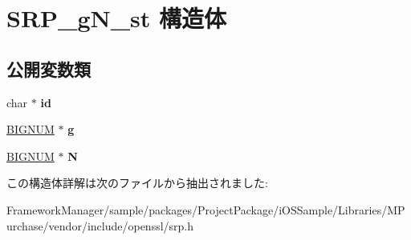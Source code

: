 \hypertarget{struct_s_r_p__g_n__st}{}\section{S\+R\+P\+\_\+g\+N\+\_\+st 構造体}
\label{struct_s_r_p__g_n__st}
\subsection*{公開変数類}
\begin{DoxyCompactItemize}
\item 
\hypertarget{struct_s_r_p__g_n__st_a26863009016da8a8a42ee5d50977327a}{}char $\ast$ {\bfseries id}\label{struct_s_r_p__g_n__st_a26863009016da8a8a42ee5d50977327a}

\item 
\hypertarget{struct_s_r_p__g_n__st_a4527dc1f493a42d33e790a86775ee7d2}{}\hyperlink{structbignum__st}{B\+I\+G\+N\+U\+M} $\ast$ {\bfseries g}\label{struct_s_r_p__g_n__st_a4527dc1f493a42d33e790a86775ee7d2}

\item 
\hypertarget{struct_s_r_p__g_n__st_a4f8b9c2a5b4d2957f8a2d5702722d0ad}{}\hyperlink{structbignum__st}{B\+I\+G\+N\+U\+M} $\ast$ {\bfseries N}\label{struct_s_r_p__g_n__st_a4f8b9c2a5b4d2957f8a2d5702722d0ad}

\end{DoxyCompactItemize}


この構造体詳解は次のファイルから抽出されました\+:\begin{DoxyCompactItemize}
\item 
Framework\+Manager/sample/packages/\+Project\+Package/i\+O\+S\+Sample/\+Libraries/\+M\+Purchase/vendor/include/openssl/srp.\+h\end{DoxyCompactItemize}

